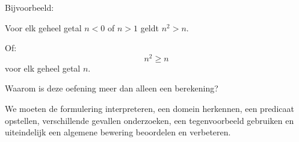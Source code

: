\documentclass{ximera}
\begin{document}
\begin{oefening}{\oefU \ESS}
\begin{question}
\begin{oplossing}
Bijvoorbeeld:

\begin{center}
Voor elk geheel getal $n<0$ of $n>1$ geldt $n^2>n$.
\end{center}

Of:
\[
n^2\geq n
\]
voor elk geheel getal $n$.
\end{oplossing}
\end{question}


\begin{question}
Waarom is deze oefening meer dan alleen een berekening?

\begin{oplossing}
We moeten de formulering interpreteren, een domein herkennen, een
predicaat opstellen, verschillende gevallen onderzoeken, een
tegenvoorbeeld gebruiken en uiteindelijk een algemene bewering
beoordelen en verbeteren.
\end{oplossing}
\end{question}

\end{oefening}
\end{document}
